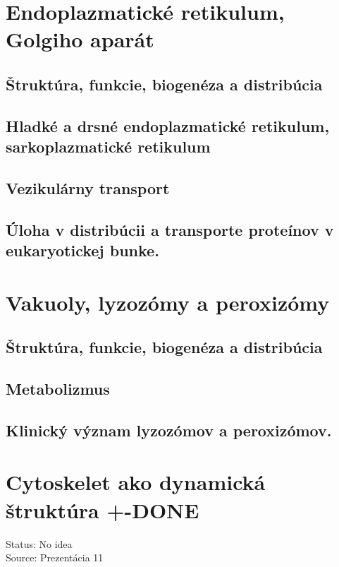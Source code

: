 \section{Endoplazmatické retikulum, Golgiho aparát}

\subsection*{Štruktúra, funkcie, biogenéza a distribúcia}

\subsection*{Hladké a drsné endoplazmatické retikulum, sarkoplazmatické retikulum}

\subsection*{Vezikulárny transport}

\subsection*{Úloha v distribúcii a transporte proteínov v eukaryotickej bunke.}

\section{Vakuoly, lyzozómy a peroxizómy}

\subsection*{Štruktúra, funkcie, biogenéza a distribúcia}

\subsection*{Metabolizmus}

\subsection*{Klinický význam lyzozómov a peroxizómov. }

\section{Cytoskelet ako dynamická štruktúra +-DONE}

Status: No idea\\
Source: Prezentácia 11\\

